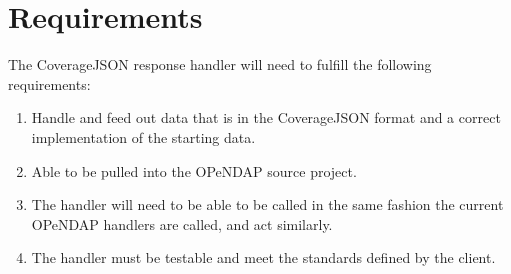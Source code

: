 \documentclass[onecolumn, draftclsnofoot,10pt, compsoc]{IEEEtran}
\begin{document}
\section{Requirements}
The CoverageJSON response handler will need to fulfill the following requirements:
\begin{enumerate}
\item Handle and feed out data that is in the CoverageJSON format and a correct implementation of the starting data.
\item Able to be pulled into the OPeNDAP source project.
\item The handler will need to be able to be called in the same fashion the current OPeNDAP handlers are called, and act similarly.
\item The handler must be testable and meet the standards defined by the client. 
\end{enumerate}
\end{document}
